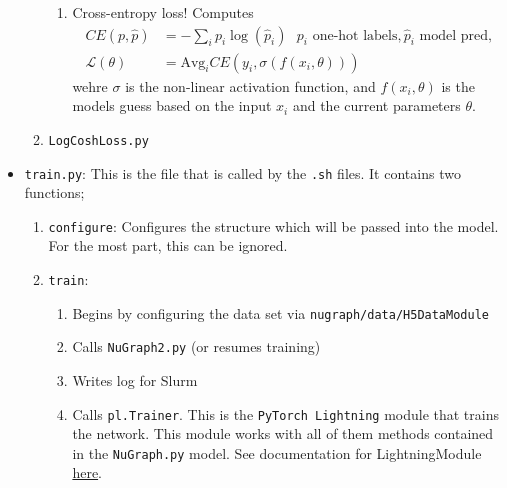 \begin{itemize}
\begin{enumerate}
\begin{enumerate}
                \item Cross-entropy loss! Computes
                \begin{equation}
                    \begin{aligned}
                        CE(p,  \hat{p}) &= -\sum_ip_i\log(\hat{p}_i) \ \ \ p_i \text{ one-hot labels}, \hat{p}_i \text{ model pred,}\\
                        \mathcal{L}(\theta) &= \text{Avg}_i CE(y_i, \sigma(f(x_i, \theta)))
                    \end{aligned}
                \end{equation}
                wehre $\sigma$ is the non-linear activation function, and $f(x_i, \theta)$ is the models guess based on the input $x_i$ and the current parameters $\theta$. 
            \end{enumerate}

        \item \texttt{LogCoshLoss.py}
    \end{enumerate}

    \item \texttt{train.py}: This is the file that is called by the \texttt{.sh} files. It contains two functions;
        \begin{enumerate}
            \item \texttt{configure}: Configures the structure which will be passed into the model. For the most part, this can be ignored. 

            \item \texttt{train}: 
                \begin{enumerate}
                    \item Begins by configuring the data set via \texttt{nugraph/data/H5DataModule}
                    \item Calls \texttt{NuGraph2.py} (or resumes training)
                    \item Writes log for Slurm
                    \item Calls \texttt{pl.Trainer}. This is the \texttt{PyTorch Lightning} module that trains the network. This module works with all of them methods contained in the \texttt{NuGraph.py} model. See documentation for LightningModule \href{https://lightning.ai/docs/pytorch/stable/common/lightning_module.html}{\color{blue} here}.
                \end{enumerate}
        \end{enumerate}


\end{itemize}
